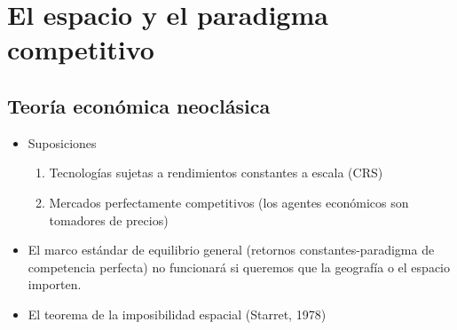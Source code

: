 \section{El espacio y el paradigma competitivo}

\subsection{Teoría económica neoclásica}

\begin{itemize}
    \item Suposiciones 
	\begin{enumerate}
	    \item Tecnologías sujetas a rendimientos constantes a escala (CRS) 
	    \item Mercados perfectamente competitivos (los agentes económicos son tomadores de precios)
	\end{enumerate}
    \item El marco estándar de equilibrio general (retornos constantes-paradigma de competencia perfecta) no funcionará si queremos que la geografía o el espacio importen.
    \item El teorema de la imposibilidad espacial (Starret, 1978)
\end{itemize}

